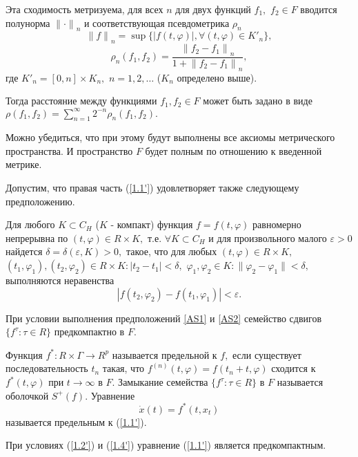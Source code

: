 	Эта сходимость метризуема, для всех $n$ для двух функций $f_1,$
	$f_2\in F$ вводится полунорма ${\|\cdot \|}_n$ и соответствующая
	псевдометрика $\rho _n$  $${\| f\|
	}_n=\sup{\{|f(t,\varphi )|, \forall (t,\varphi )\in {K'}_n\} },$$
	$$\rho _n(f_1,f_2)=\frac{{\| f_2-f_1\| }_n}{1+{\| f_2-f_1\|
		}_n},$$ \noindent где ${K'}_n=[0,n]\times K_n,$ $n=1,2,\ldots $
	($K_n$ определено выше).
	
	Тогда расстояние между функциями $f_1, f_2\in F$ может быть задано в виде
	$\rho (f_1,f_2)=\sum_{n=1}^{\infty }{2^{-n}\rho _n(f_1,f_2)}.
	\label{1.3'}$
	
	Можно убедиться, что при этому будут выполнены все аксиомы
	метрического пространства. И пространство
	$F$ будет полным по отношению к введенной метрике.
	
	Допустим,  что правая  часть   (\ref{1.1'})   удовлетворяет   также
	следующему предположению.
	
	\begin{definition}\label{AS2} Для любого $K\subset C_H$ ($K$ - компакт)
		функция $f=f(t,\varphi )$ равномерно непрерывна по
		$(t, \varphi )\in R\times K,$ т.е. $\forall K\subset C_H$ и для произвольного малого $\varepsilon
		>0$ найдется $\delta =\delta (\varepsilon ,K)>0,$ такое, что для
		любых $(t,\varphi)\in R\times K,$ $(t_1,\varphi _1),
		(t_2,\varphi _2)\in R\times K: |t_2-t_1|<\delta,$ $\varphi _1,
		\varphi _2\in K:\|\varphi _2-\varphi _1\|<\delta,$ выполняются
		неравенства
		\begin{equation}
		|f(t_2,\varphi _2)-f(t_1,\varphi
		_1)|<\varepsilon. \label{1.4'}
		\end{equation}
	\end{definition}
	
	\begin{lemma}\label{l-1.3} При условии выполнения предположений \ref{AS1} и \ref{AS2}
		семейство сдвигов $\{f^{\tau }:\tau\in R\}$
		предкомпактно в $F.$
	\end{lemma}
	
	\begin{definition}\label{d-1.1} Функция $f^*:R\times\Gamma \to R^p$ называется предельной
		к $f,$ если существует  последовательность ${t_n}$
		такая,  что ${f^{(n)}(t,\varphi )=f(t_n+t,\varphi )}$ сходится к
		$f^*(t,\varphi )$ при $t \to \infty$ в $F.$ Замыкание семейства $\{f^{\tau }:\tau \in
		R\}$ в $F$ называется оболочкой $S^+(f).$ Уравнение
		\begin{equation}
		\dot x(t)=f^*(t,x_t) \label{1.5'}
		\end{equation}
		называется предельным к (\ref{1.1'}).
	\end{definition}
	При  условиях (\ref{1.2'}) и (\ref{1.4'})
	уравнение  (\ref{1.1'}) является предкомпактным.
	

